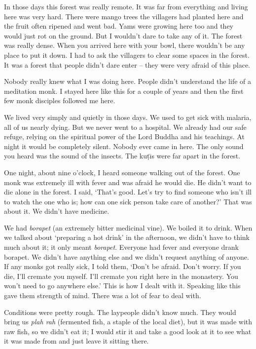 In those days this forest was really remote. It was far from everything and living here was very hard. There were mango trees the villagers had planted here and the fruit often ripened and went bad. Yams were growing here too and they would just rot on the ground. But I wouldn't dare to take any of it. The forest was really dense. When you arrived here with your bowl, there wouldn't be any place to put it down. I had to ask the villagers to clear some spaces in the forest. It was a forest that people didn't dare enter -- they were very afraid of this place.

Nobody really knew what I was doing here. People didn't understand the life of a meditation monk. I stayed here like this for a couple of years and then the first few monk disciples followed me here.

We lived very simply and quietly in those days. We used to get sick with malaria, all of us nearly dying. But we never went to a hospital. We already had our safe refuge, relying on the spiritual power of the Lord Buddha and his teachings. At night it would be completely silent. Nobody ever came in here. The only sound you heard was the sound of the insects. The ku\d{t}\={\i}s were far apart in the forest.

One night, about nine o'clock, I heard someone walking out of the forest. One monk was extremely ill with fever and was afraid he would die. He didn't want to die alone in the forest. I said, `That's good. Let's try to find someone who isn't ill to watch the one who is; how can one sick person take care of another?' That was about it. We didn't have medicine.

We had \textit{borapet} (an extremely bitter medicinal vine). We boiled it to drink. When we talked about `preparing a hot drink' in the afternoon, we didn't have to think much about it; it only meant \textit{borapet}. Everyone had fever and everyone drank borapet. We didn't have anything else and we didn't request anything of anyone. If any monks got really sick, I told them, `Don't be afraid. Don't worry. If you die, I'll cremate you myself. I'll cremate you right here in the monastery. You won't need to go anywhere else.' This is how I dealt with it. Speaking like this gave them strength of mind. There was a lot of fear to deal with.

Conditions were pretty rough. The laypeople didn't know much. They would bring us \textit{plah rah} (fermented fish, a staple of the local diet), but it was made with raw fish, so we didn't eat it; I would stir it and take a good look at it to see what it was made from and just leave it sitting there.

